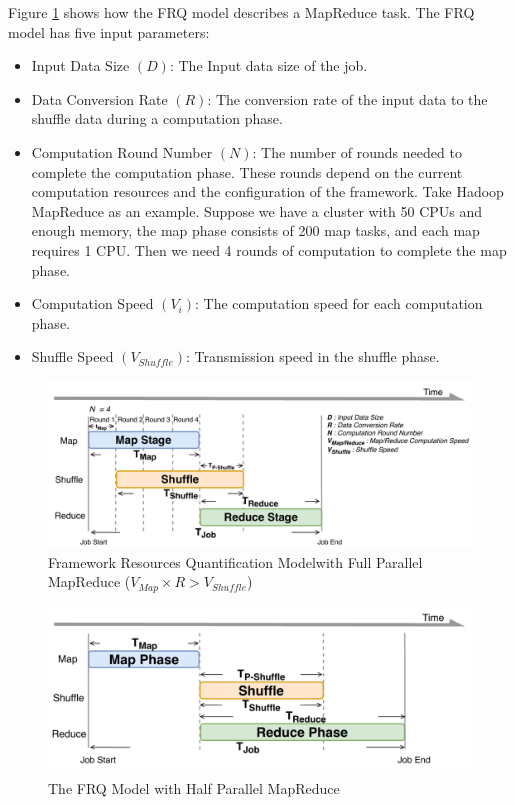 {Figure \ref{fig:model_basic} shows how the FRQ model describes a MapReduce task. The FRQ model has five input parameters:
\begin{itemize}
	\item Input Data Size \((D)\): The  Input data size of the job.
	\item Data Conversion Rate \((R)\): The conversion rate of the input data to the shuffle data during a computation phase.
    \item Computation Round Number \((N)\): The number of rounds needed to complete the computation phase. These rounds depend on the current computation resources and the configuration of the framework. Take Hadoop MapReduce as an example. Suppose we have a cluster with 50 CPUs and enough memory, the map phase consists of 200 map tasks, and each map requires 1 CPU. Then we need 4 rounds of computation to complete the map phase.
    \item Computation Speed \((V_{i})\): 
	The computation speed for each computation phase.
    \item Shuffle Speed \((V_{Shuffle})\): 
	Transmission speed in the shuffle phase.
\end{itemize}

\begin{figure}
    \centering
	\includegraphics[width=\linewidth]{fig/model_basic}
	\caption{\color{black}Framework Resources Quantification Model\newline with Full Parallel MapReduce (\(V_{Map} \times R > V_{Shuffle}\))}
    \label{fig:model_basic}
\end{figure}
\begin{figure}
	\centering
	\includegraphics[width=\linewidth]{fig/model_hadoop}
	\caption{\color{black}The FRQ Model with Half Parallel MapReduce}
	\label{fig:model_hadoop}
\end{figure}

}

